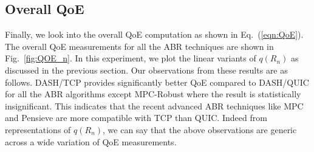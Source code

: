 
\subsection{Overall QoE}
Finally, we look into the overall QoE computation as shown in Eq.~(\ref{eqn:QoE}). The overall QoE measurements for  all the ABR techniques are shown in Fig.~\ref{fig:QOE_n}. In this experiment, we plot the linear variants of $q(R_n)$ as discussed in the previous section. Our observations from these results are as follows. DASH/TCP provides significantly better QoE compared to DASH/QUIC for all the ABR algorithms except MPC-Robust where the result is statistically insignificant. This indicates that the recent advanced ABR techniques like MPC and Pensieve are more compatible with TCP than QUIC. Indeed from representations of $q(R_n)$, we can say that the above observations are generic across a wide variation of QoE measurements. 


